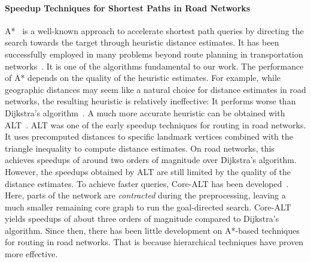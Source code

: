 \documentclass[manuscript]{acmart}
\begin{document}
\paragraph{Speedup Techniques for Shortest Paths in Road Networks}
A*~\cite{hnr-afbhd-68} is a well-known approach to accelerate shortest path queries by directing the search towards the target through heuristic distance estimates.
It has been successfully employed in many problems beyond route planning in transportation networks~\cite{DBLP:conf/socs/StrasserHB14,DBLP:conf/ijcai/BonoGHS19,DBLP:conf/ijcai/0002UJAKK18}.
It is one of the algorithms fundamental to our work.
The performance of A* depends on the quality of the heuristic estimates.
For example, while geographic distances may seem like a natural choice for distance estimates in road networks, the resulting heuristic is relatively ineffective: It performs worse than Dijkstra's algorithm~\cite{gh-cspas-05}.
A much more accurate heuristic can be obtained with ALT~\cite{gh-cspas-05,gw-cppsp-05}.
ALT was one of the early speedup techniques for routing in road networks.
It uses precomputed distances to specific landmark vertices combined with the triangle inequality to compute distance estimates.
On road networks, this achieves speedups of around two orders of magnitude over Dijkstra's algorithm.
However, the speedups obtained by ALT are still limited by the quality of the distance estimates.
To achieve faster queries, Core-ALT has been developed~\cite{bdsssw-chgds-10}.
Here, parts of the network are \emph{contracted} during the preprocessing, leaving a much smaller remaining core graph to run the goal-directed search.
Core-ALT yields speedups of about three orders of magnitude compared to Dijkstra's algorithm.
Since then, there has been little development on A*-based techniques for routing in road networks.
That is because hierarchical techniques have proven more effective.
\end{document}
